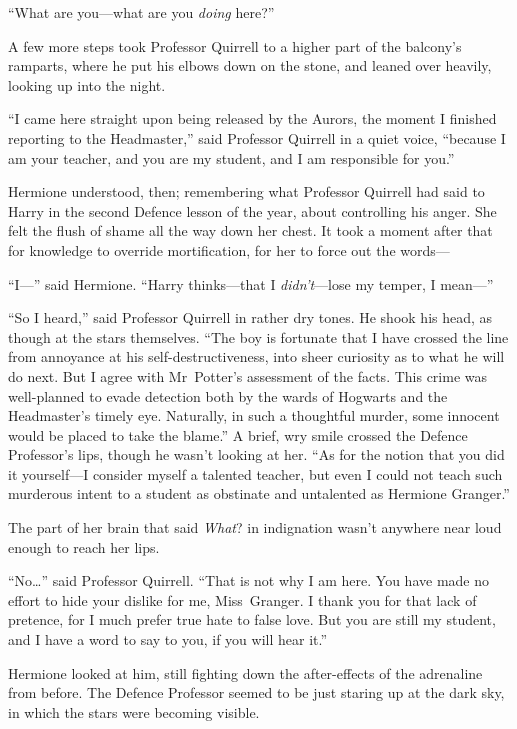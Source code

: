 “What are you—what are you \emph{doing} here?”

A few more steps took Professor Quirrell to a higher part of the balcony’s ramparts, where he put his elbows down on the stone, and leaned over heavily, looking up into the night.

“I came here straight upon being released by the Aurors, the moment I finished reporting to the Headmaster,” said Professor Quirrell in a quiet voice, “because I am your teacher, and you are my student, and I am responsible for you.”

Hermione understood, then; remembering what Professor Quirrell had said to Harry in the second Defence lesson of the year, about controlling his anger. She felt the flush of shame all the way down her chest. It took a moment after that for knowledge to override mortification, for her to force out the words—

“I—” said Hermione. “Harry thinks—that I \emph{didn’t}—lose my temper, I mean—”

“So I heard,” said Professor Quirrell in rather dry tones. He shook his head, as though at the stars themselves. “The boy is fortunate that I have crossed the line from annoyance at his self-destructiveness, into sheer curiosity as to what he will do next. But I agree with Mr~Potter’s assessment of the facts. This crime was well-planned to evade detection both by the wards of Hogwarts and the Headmaster’s timely eye. Naturally, in such a thoughtful murder, some innocent would be placed to take the blame.” A brief, wry smile crossed the Defence Professor’s lips, though he wasn’t looking at her. “As for the notion that you did it yourself—I consider myself a talented teacher, but even I could not teach such murderous intent to a student as obstinate and untalented as Hermione Granger.”

The part of her brain that said \emph{What}? in indignation wasn’t anywhere near loud enough to reach her lips.

“No…” said Professor Quirrell. “That is not why I am here. You have made no effort to hide your dislike for me, Miss~Granger. I thank you for that lack of pretence, for I much prefer true hate to false love. But you are still my student, and I have a word to say to you, if you will hear it.”

Hermione looked at him, still fighting down the after-effects of the adrenaline from before. The Defence Professor seemed to be just staring up at the dark sky, in which the stars were becoming visible.

